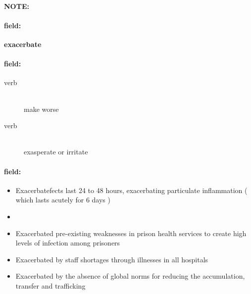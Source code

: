 \documentclass[12pt]{article}
\newenvironment{note}{\paragraph{NOTE:}}{}
\newenvironment{field}{\paragraph{field:}}{}
\begin{document}
\begin{note}
\begin{field}
\textbf{\large exacerbate}
\end{field}


\begin{field}
\begin{description}
\item[verb] \hfill \\ 
make worse

\item[verb] \hfill \\ 
exasperate or irritate

\end{description}
\end{field}

\begin{field}
\begin{itemize}
\item Exacerbatefects last 24 to 48 hours, exacerbating particulate inflammation ( which lasts acutely for 6 days )
\item 
\item Exacerbated pre-existing weaknesses in prison health services to create high levels of infection among prisoners
\item Exacerbated by staff shortages through illnesses in all hospitals
\item Exacerbated by the absence of global norms for reducing the accumulation, transfer and trafficking
\end{itemize}
\end{field}
\end{note}
\end{document}
